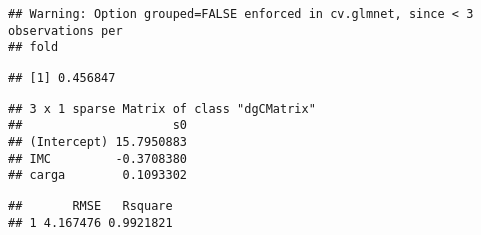 \documentclass[]{article}
\newenvironment{Shaded}{\begin{snugshade}}{\end{snugshade}}
\newcommand{\DataTypeTok}[1]{\textcolor[rgb]{0.13,0.29,0.53}{#1}}
\newcommand{\DecValTok}[1]{\textcolor[rgb]{0.00,0.00,0.81}{#1}}
\newcommand{\KeywordTok}[1]{\textcolor[rgb]{0.13,0.29,0.53}{\textbf{#1}}}
\newcommand{\NormalTok}[1]{#1}
\newcommand{\OperatorTok}[1]{\textcolor[rgb]{0.81,0.36,0.00}{\textbf{#1}}}
\newcommand{\StringTok}[1]{\textcolor[rgb]{0.31,0.60,0.02}{#1}}
\begin{document}
\begin{verbatim}
## Warning: Option grouped=FALSE enforced in cv.glmnet, since < 3 observations per
## fold
\end{verbatim}

\begin{Shaded}
\end{Shaded}

\begin{verbatim}
## [1] 0.456847
\end{verbatim}

\begin{Shaded}
\end{Shaded}

\begin{verbatim}
## 3 x 1 sparse Matrix of class "dgCMatrix"
##                     s0
## (Intercept) 15.7950883
## IMC         -0.3708380
## carga        0.1093302
\end{verbatim}

\begin{Shaded}
\end{Shaded}

\begin{verbatim}
##       RMSE   Rsquare
## 1 4.167476 0.9921821
\end{verbatim}
\end{document}
